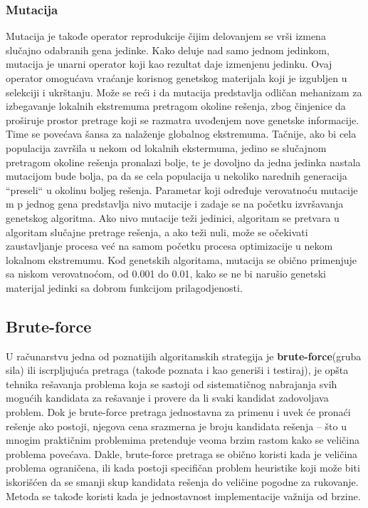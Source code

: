 \documentclass[a4paper]{article}
\begin{document}
\subsubsection{Mutacija}
Mutacija je takođe operator reprodukcije čijim delovanjem se vrši izmena slučajno odabranih gena jedinke. Kako deluje nad samo jednom jedinkom, mutacija je unarni operator koji kao rezultat daje izmenjenu jedinku. Ovaj operator omogućava vraćanje korisnog genetskog materijala koji je izgubljen u selekciji i ukrštanju. Može se reći i da mutacija predstavlja odličan mehanizam za izbegavanje lokalnih ekstremuma pretragom okoline rešenja, zbog činjenice da proširuje prostor pretrage koji se razmatra uvođenjem nove genetske informacije. Time se povećava šansa za nalaženje globalnog ekstremuma.  Tačnije, ako bi cela populacija završila u nekom od lokalnih ekstermuma, jedino se slučajnom pretragom okoline rešenja pronalazi bolje, te je dovoljno da jedna jedinka nastala mutacijom bude bolja, pa da se cela populacija u nekoliko narednih generacija “preseli“ u okolinu boljeg rešenja. Parametar koji određuje verovatnoću mutacije m p jednog gena predstavlja nivo mutacije i zadaje se na početku izvršavanja genetskog algoritma. Ako nivo mutacije teži jedinici, algoritam se pretvara u algoritam slučajne pretrage rešenja, a ako teži nuli, može se očekivati zaustavljanje procesa već na samom početku procesa optimizacije u nekom lokalnom ekstremumu. Kod genetskih algoritama, mutacija se obično primenjuje sa niskom verovatnoćom, od 0.001 do 0.01, kako se ne bi narušio genetski materijal jedinki sa dobrom funkcijom prilagodjenosti.


\subsection{Brute-force}
U računarstvu jedna od poznatijih algoritamskih strategija je \textbf{brute-force}(gruba sila) ili iscrpljujuća pretraga (takođe poznata i kao generiši i testiraj), je opšta tehnika rešavanja problema koja se sastoji od sistematičnog nabrajanja svih mogućih kandidata za rešavanje i provere da li svaki kandidat zadovoljava problem. Dok je brute-force pretraga jednostavna za primenu i uvek će pronaći rešenje ako postoji, njegova cena srazmerna je broju kandidata rešenja – što u mnogim praktičnim problemima pretenduje veoma brzim rastom kako se veličina problema povećava. Dakle, brute-force pretraga se obično koristi kada je veličina problema ograničena, ili kada postoji specifičan problem heuristike koji može biti iskorišćen da se smanji skup kandidata rešenja do veličine pogodne za rukovanje. Metoda se takođe koristi kada je jednostavnost implementacije važnija od brzine.
\end{document}
